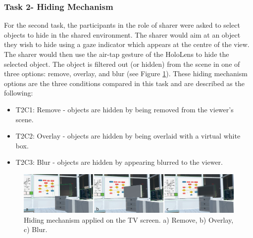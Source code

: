 \subsubsection{Task 2- Hiding Mechanism}

For the second task, the participants in the role of sharer were asked to select objects to hide in the shared environment. The sharer would aim at an object they wish to hide using a gaze indicator which appears at the centre of the view. The sharer would then use the air-tap gesture of the HoloLens to hide the selected object. The object is filtered out (or hidden) from the scene in one of three options: remove, overlay, and blur (see Figure \ref{fig:frontier18:hiding-mechanism}). These hiding mechanism options are the three conditions compared in this task and are described as the following:

\begin{itemize}
\item T2C1: Remove - objects are hidden by being removed from the viewer's scene.
\item T2C2: Overlay - objects are hidden by being overlaid with a virtual white box. 
\item T2C3: Blur - objects are hidden by appearing blurred to the viewer. 
\end{itemize}

\begin{figure}[ht]
    \begin{center}
    \includegraphics[width=\linewidth]{images/54-hiding-frontier18/images-01.png}
    \caption{Hiding mechanism applied on the TV screen. a) Remove, b) Overlay, c) Blur.}\label{fig:frontier18:hiding-mechanism}
    \end{center}
\end{figure}



